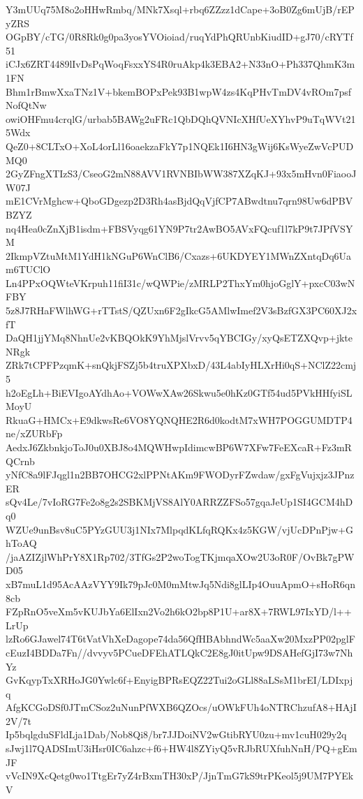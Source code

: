 Y3mUUq75M8o2oHHwRmbq/MNk7Xsql+rbq6ZZzz1dCape+3oB0Zg6mUjB/rEPyZRS
OGpBY/cTG/0R8Rk0g0pa3yosYVOioiad/ruqYdPhQRUnbKiudID+gJ70/cRYTf51
iCJx6ZRT4489lIvDsPqWoqFsxxYS4R0ruAkp4k3EBA2+N33nO+Ph337QhmK3m1FN
Bhm1rBmwXxaTNz1V+bkemBOPxPek93B1wpW4zs4KqPHvTmDV4vROm7psfNofQtNw
owiOHFmu4crqlG/urbab5BAWg2uFRc1QbDQhQVNIcXHfUeXYhvP9uTqWVt215Wdx
QeZ0+8CLTxO+XoL4orLl16oaekzaFkY7p1NQEk1I6HN3gWij6KsWyeZwVcPUDMQ0
2GyZFngXTIzS3/CseoG2mN88AVV1RVNBIbWW387XZqKJ+93x5mHvn0FiaooJW07J
mE1CVrMghcw+QboGDgezp2D3Rh4asBjdQqVjfCP7ABwdtnu7qrn98Uw6dPBVBZYZ
nq4Hea0cZnXjB1isdm+FBSVyqg61YN9P7tr2AwBO5AVxFQcuf1l7kP9t7JPfVSYM
2IkmpVZtuMtM1YdH1kNGuP6WnClB6/Cxazs+6UKDYEY1MWnZXntqDq6Uam6TUClO
Ln4PPxOQWteVKrpuh11fiI31c/wQWPie/zMRLP2ThxYm0hjoGglY+pxcC03wNFBY
5z8J7RHaFWlhWG+rTTstS/QZUxn6F2gIkcG5AMlwImef2V3sBzfGX3PC60XJ2xfT
DaQH1jjYMq8NhnUe2vKBQOkK9YhMjslVrvv5qYBCIGy/xyQsETZXQvp+jkteNRgk
ZRk7tCPFPzqmK+snQkjFSZj5b4truXPXbxD/43L4abIyHLXrHi0qS+NClZ22cmj5
h2oEgLh+BiEVIgoAYdhAo+VOWwXAw26Skwu5e0hKz0GTf54ud5PVkHHfyiSLMoyU
RkuaG+HMCx+E9dkwsRe6VO8YQNQHE2R6d0kodtM7xWH7POGGUMDTP4ne/xZURbFp
AedxJ6ZkbnkjoToJ0u0XBJ8o4MQWHwpIdimcwBP6W7XFw7FeEXcaR+Fz3mRQCrnb
yNfC8a9lFJqgl1n2BB7OHCG2xlPPNtAKm9FWODyrFZwdaw/gxFgVujxjz3JPnzER
sQv4Le/7vIoRG7Fe2o8g2s2SBKMjVS8AlY0ARRZZFSo57gqaJeUp1SI4GCM4hDq0
WZUe9unBsv8uC5PYzGUU3j1NIx7MlpqdKLfqRQKx4z5KGW/vjUcDPnPjw+GhToAQ
/jaAZIZjlWhPrY8X1Rp702/3TfGs2P2woTogTKjmqaXOw2U3oR0F/OvBk7gPWD05
xB7muL1d95AcAAzVYY9Ik79pJc0M0mMtwJq5Ndi8glLIp4OuuApmO+sHoR6qn8cb
FZpRnO5veXm5vKUJbYa6ElIxn2Vo2h6kO2bp8P1U+ar8X+7RWL97IxYD/l++LrUp
lzRo6GJawel74T6tVatVhXeDagope74da56QfHBAbhndWc5aaXw20MxzPP02pglF
cEuzI4BDDa7Fn//dvvyv5PCueDFEhATLQkC2E8gJ0itUpw9DSAHefGjI73w7NhYz
GvKqypTxXRHoJG0Ywlc6f+EnyigBPRsEQZ22Tui2oGLl88aLSsM1brEI/LDIxpjq
AfgKCGoDSf0JTmCSoz2uNunPfWXB6QZOcs/uOWkFUh4oNTRChzufA8+HAjI2V/7t
Ip5bqlgduSFldLja1Dab/Nob8Qi8/br7JJDoiNV2wGtibRYU0zu+mv1cuH029y2q
sJwj1l7QADSImU3iHsr0IC6ahzc+f6+HW4l8ZYiyQ5vRJbRUXfuhNnH/PQ+gEmJF
vVcIN9XcQetg0wo1TtgEr7yZ4rBxmTH30xP/JjnTmG7kS9trPKeol5j9UM7PYEkV
